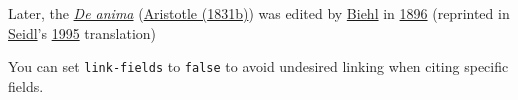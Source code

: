 \documentclass[
  12pt,
  a4paper,
  oneside]{scrbook}
\begin{document}
Later, the
\protect\hypertarget{cite_40}{}{\label{cite_40}\protect\hyperlink{ref-DA}{\emph{De anima}}}
(\protect\hypertarget{cite_42}{}{\label{cite_42}\protect\hyperlink{ref-DA}{{\protect\hypertarget{cite_41}{}{\label{cite_41}Aristotle
(\protect\hyperlink{ref-DA}{1831b})}}}}) was edited by
\protect\hypertarget{cite_43}{}{\label{cite_43}\protect\hyperlink{ref-DABiehl1896}{Biehl}}
in
\protect\hypertarget{cite_44}{}{\label{cite_44}\protect\hyperlink{ref-DABiehl1896}{1896}}
(reprinted in
\protect\hypertarget{cite_45}{}{\label{cite_45}\protect\hyperlink{ref-DATheiler}{Seidl}}'s
\protect\hypertarget{cite_46}{}{\label{cite_46}\protect\hyperlink{ref-DATheiler}{1995}}
translation)

\begin{tcolorbox}[enhanced jigsaw, bottomtitle=1mm, left=2mm, colframe=quarto-callout-tip-color-frame, colback=white, bottomrule=.15mm, title=\textcolor{quarto-callout-tip-color}{\faLightbulb}\hspace{0.5em}{Tip}, toprule=.15mm, toptitle=1mm, titlerule=0mm, opacitybacktitle=0.6, leftrule=.75mm, rightrule=.15mm, breakable, colbacktitle=quarto-callout-tip-color!10!white, arc=.35mm, opacityback=0, coltitle=black]

You can set \texttt{link-fields} to \texttt{false} to avoid undesired
linking when citing specific fields.

\end{tcolorbox}
\end{document}
